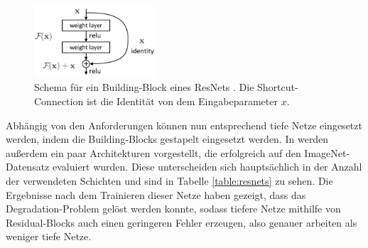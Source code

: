 \begin{figure}
    \centering
    \includegraphics[width=0.4\textwidth]{images/resnet_building_block.png}
    \caption{Schema für ein Building-Block eines ResNets \cite{he2015deep}. Die
    Shortcut-Connection ist die Identität von dem Eingabeparameter $x$.}
    \label{fig:resnet-building-block}
\end{figure}

Abhängig von den Anforderungen können nun entsprechend tiefe Netze eingesetzt
werden, indem die Building-Blocks gestapelt eingesetzt werden. In
\cite{he2015deep} werden außerdem ein paar Architekturen vorgestellt, die
erfolgreich auf den ImageNet-Datensatz \cite{deng2009imagenet} evaluiert wurden.
Diese unterscheiden sich hauptsächlich in der Anzahl der verwendeten Schichten
und sind in Tabelle \ref{table:resnets} zu sehen. Die Ergebnisse nach dem
Trainieren dieser Netze haben gezeigt, dass das Degradation-Problem gelöst
werden konnte, sodass tiefere Netze mithilfe von Residual-Blocks auch einen
geringeren Fehler erzeugen, also genauer arbeiten als weniger tiefe Netze.

